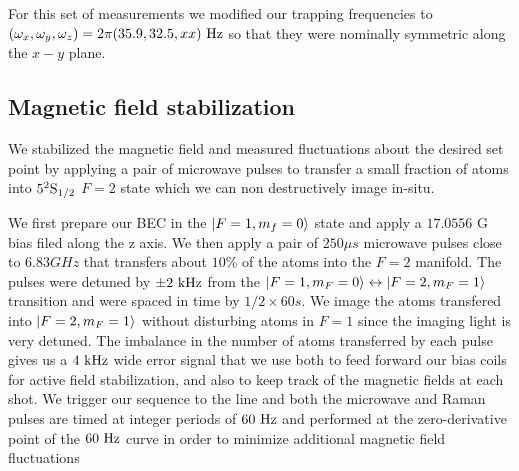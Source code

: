 
For this set of measurements we modified our trapping frequencies to $(\omega_x, \omega_y, \omega_z)=2\pi(35.9, 32.5, xx) {\ {\rm Hz}}$  so that they were nominally symmetric along the $x-y$ plane. 

\subsection{Magnetic field stabilization}
We stabilized the magnetic field and measured fluctuations about the desired set point by applying a pair of microwave pulses to transfer a small fraction of atoms into $5^2{\rm S}_{1/2}$ $F=2$ state which we can non destructively image in-situ.

We first prepare our BEC in the $|F=1, m_f=0\rangle$ state and apply a $17.0556$ G bias filed along the z axis. We then apply a pair of $250\mu s$ microwave pulses close to $6.83 GHz$ that transfers about $10\%$ of the atoms into the $F=2$ manifold. The pulses were detuned by $\pm 2{\ {\rm kHz}}$ from the $|F=1,m_F=0\rangle\leftrightarrow|F=2,m_F=1\rangle$ transition and were spaced in time by $1/2\times 60 s$. We image the atoms transfered into $|F=2,m_F=1\rangle$ without disturbing atoms in $F=1$ since the imaging light is very detuned. The imbalance in the number of atoms transferred by each pulse gives us a $4{\ {\rm kHz}}$ wide error signal that we use both to feed forward our bias coils for active field stabilization, and also to keep track of the magnetic fields at each shot. We trigger our sequence to the line and both the microwave and Raman pulses are timed at integer periods of $60{\ {\rm Hz}}$ and performed at the zero-derivative point of the $60{\ {\rm Hz}}$ curve in order to minimize additional magnetic field fluctuations
